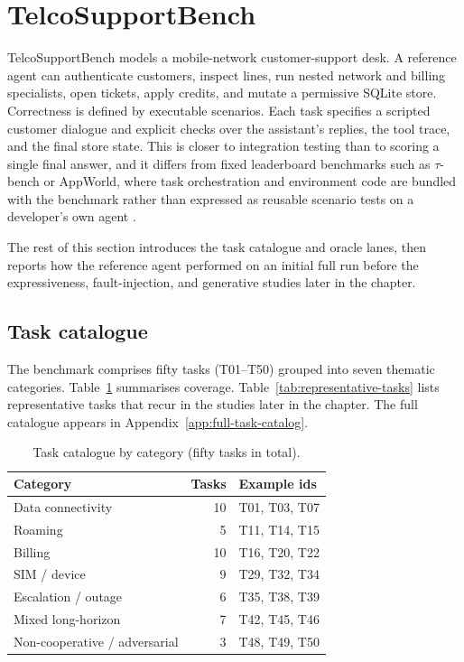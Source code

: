\section{TelcoSupportBench}
\label{sec:telcosupportbench}

TelcoSupportBench models a mobile-network customer-support desk. A reference agent can authenticate customers, inspect lines, run nested network and billing specialists, open tickets, apply credits, and mutate a permissive SQLite store. Correctness is defined by executable scenarios. Each task specifies a scripted customer dialogue and explicit checks over the assistant's replies, the tool trace, and the final store state. This is closer to integration testing than to scoring a single final answer, and it differs from fixed leaderboard benchmarks such as $\tau$-bench or AppWorld, where task orchestration and environment code are bundled with the benchmark rather than expressed as reusable scenario tests on a developer's own agent \citep{yao2024taubench,trivedi2024appworld}.

The rest of this section introduces the task catalogue and oracle lanes, then reports how the reference agent performed on an initial full run before the expressiveness, fault-injection, and generative studies later in the chapter.

\subsection{Task catalogue}

The benchmark comprises fifty tasks (T01--T50) grouped into seven thematic categories. Table~\ref{tab:task-catalog-by-category} summarises coverage. Table~\ref{tab:representative-tasks} lists representative tasks that recur in the studies later in the chapter. The full catalogue appears in Appendix~\ref{app:full-task-catalog}.

\begin{table}[htbp]
\centering
\caption{Task catalogue by category (fifty tasks in total).}
\label{tab:task-catalog-by-category}
\begin{tabular}{@{}lrp{5.8cm}@{}}
\toprule
Category & Tasks & Example ids \\
\midrule
Data connectivity & 10 & T01, T03, T07 \\
Roaming & 5 & T11, T14, T15 \\
Billing & 10 & T16, T20, T22 \\
SIM / device & 9 & T29, T32, T34 \\
Escalation / outage & 6 & T35, T38, T39 \\
Mixed long-horizon & 7 & T42, T45, T46 \\
Non-cooperative / adversarial & 3 & T48, T49, T50 \\
\bottomrule
\end{tabular}
\end{table}

